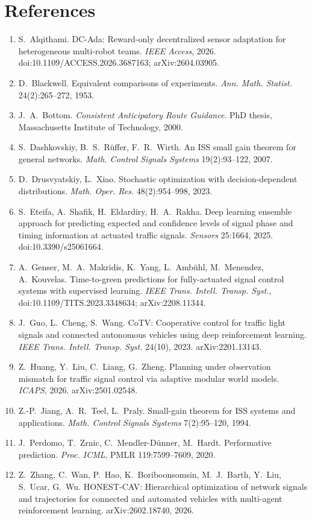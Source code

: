 \documentclass[11pt]{article}
\begin{document}
\section*{References}
\small
\begin{enumerate}\setlength\itemsep{1pt}
\renewcommand{\labelenumi}{[\arabic{enumi}]}
\item S.~Alqithami. DC-Ada: Reward-only decentralized sensor adaptation for heterogeneous multi-robot teams. \emph{IEEE Access}, 2026.
doi:10.1109/ACCESS.2026.3687163; arXiv:2604.03905.
\item D.~Blackwell. Equivalent comparisons of experiments. \emph{Ann. Math. Statist.} 24(2):265--272, 1953.
\item J.~A.~Bottom. \emph{Consistent Anticipatory Route Guidance}. PhD thesis, Massachusetts Institute of Technology, 2000.
\item S.~Dashkovskiy, B.~S.~R\"uffer, F.~R.~Wirth. An ISS small gain theorem for general networks. \emph{Math. Control Signals Systems}
19(2):93--122, 2007.
\item D.~Drusvyatskiy, L.~Xiao. Stochastic optimization with decision-dependent distributions. \emph{Math. Oper. Res.} 48(2):954--998, 2023.
\item S.~Eteifa, A.~Shafik, H.~Eldardiry, H.~A.~Rakha. Deep learning ensemble approach for predicting expected and confidence levels of
signal phase and timing information at actuated traffic signals. \emph{Sensors} 25:1664, 2025. doi:10.3390/s25061664.
\item A.~Genser, M.~A.~Makridis, K.~Yang, L.~Amb\"uhl, M.~Menendez, A.~Kouvelas. Time-to-green predictions for fully-actuated signal
control systems with supervised learning. \emph{IEEE Trans. Intell. Transp. Syst.}, doi:10.1109/TITS.2023.3348634; arXiv:2208.11344.
\item J.~Guo, L.~Cheng, S.~Wang. CoTV: Cooperative control for traffic light signals and connected autonomous vehicles using deep
reinforcement learning. \emph{IEEE Trans. Intell. Transp. Syst.} 24(10), 2023. arXiv:2201.13143.
\item Z.~Huang, Y.~Liu, C.~Liang, G.~Zheng. Planning under observation mismatch for traffic signal control via adaptive modular world
models. \emph{ICAPS}, 2026. arXiv:2501.02548.
\item Z.-P.~Jiang, A.~R.~Teel, L.~Praly. Small-gain theorem for ISS systems and applications. \emph{Math. Control Signals Systems}
7(2):95--120, 1994.
\item J.~Perdomo, T.~Zrnic, C.~Mendler-D\"unner, M.~Hardt. Performative prediction. \emph{Proc. ICML}, PMLR 119:7599--7609, 2020.
\item Z.~Zhang, C.~Wan, P.~Hao, K.~Boriboonsomsin, M.~J.~Barth, Y.~Liu, S.~Ucar, G.~Wu. HONEST-CAV: Hierarchical optimization of network
signals and trajectories for connected and automated vehicles with multi-agent reinforcement learning. arXiv:2602.18740, 2026.
\end{enumerate}
\normalsize
\end{document}
